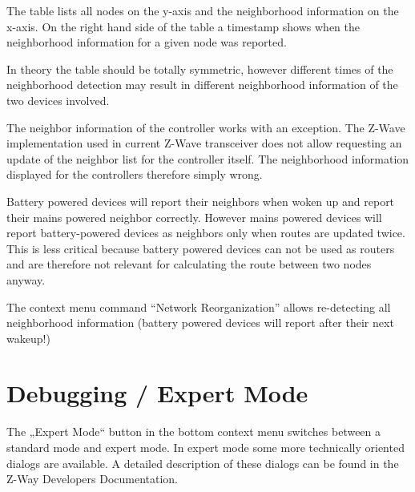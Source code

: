 The table lists all nodes on the y-axis and the neighborhood information on the x-axis. On the 
right hand side of the table a timestamp shows when the neighborhood information for a given node 
was reported.   

In theory the table should be totally symmetric, however different times of the neighborhood detection 
may result in different neighborhood information of the two devices involved.
 
The neighbor information of the controller works with an exception. The Z-Wave implementation used 
in current Z-Wave transceiver does not allow requesting an update of the neighbor list for the 
controller itself. The neighborhood information displayed for the controllers therefore simply wrong.

Battery powered devices will report their neighbors when woken up and report their mains powered 
neighbor correctly. However mains powered devices will report battery-powered devices as neighbors 
only when routes are updated twice. This is less critical because battery powered devices can not be 
used as routers and are therefore not relevant for calculating the route between two nodes anyway. 
 
The context menu command “Network Reorganization” allows re-detecting all neighborhood 
information (battery powered devices will report after their next wakeup!)  

\section{Debugging / Expert Mode}

The „Expert Mode“ button in the bottom context menu switches between a standard mode and expert mode. 
In expert mode some more technically oriented dialogs are available. A detailed description
of these dialogs can be found in the Z-Way Developers Documentation.

